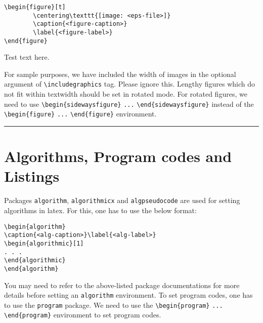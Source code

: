 \documentclass[unnumsec,webpdf,contemporary,large]{oup-authoring-template}%
\theoremstyle{thmstyleone}%
\theoremstyle{thmstyletwo}%
\theoremstyle{thmstylethree}%
\begin{document}
\begin{verbatim}
\begin{figure}[t]
        \centering\texttt{[image: <eps-file>]}
        \caption{<figure-caption>}
        \label{<figure-label>}
\end{figure}
\end{verbatim}

Test text here.

For sample purposes, we have included the width of images in the
optional argument of \verb+\includegraphics+ tag. Please ignore this.
Lengthy figures which do not fit within textwidth should be set in rotated mode. For rotated figures, we need to use \verb+\begin{sidewaysfigure}+ \verb+...+ \verb+\end{sidewaysfigure}+ instead of the \verb+\begin{figure}+ \verb+...+ \verb+\end{figure}+ environment.

\begin{sidewaysfigure}%
\centering
{\color{black!20}\rule{610pt}{102pt}}
\caption{This is an example for a sideways figure. This is an example of a long caption this is an example of a long caption  this is an example of a long caption this is an example of a long caption}\label{fig3}
\end{sidewaysfigure}



\section{Algorithms, Program codes and Listings}\label{sec7}

Packages \verb+algorithm+, \verb+algorithmicx+ and \verb+algpseudocode+ are used for setting algorithms in latex.
For this, one has to use the below format:


\begin{verbatim}
\begin{algorithm}
\caption{<alg-caption>}\label{<alg-label>}
\begin{algorithmic}[1]
. . .
\end{algorithmic}
\end{algorithm}
\end{verbatim}


You may need to refer to the above-listed package documentations for more details before setting an \verb+algorithm+ environment.
To set program codes, one has to use the \verb+program+ package. We need to use the \verb+\begin{program}+ \verb+...+
\verb+\end{program}+ environment to set program codes.
\end{document}
